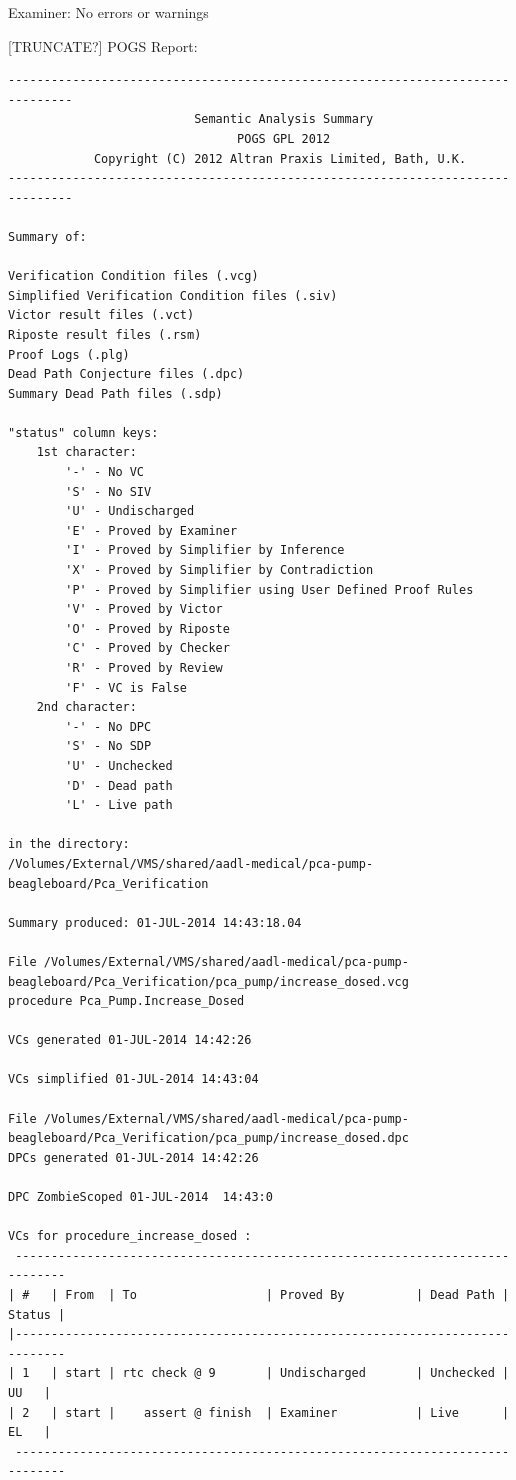 Examiner:
No errors or warnings

[TRUNCATE?]
POGS Report:
\singlespacing
\begin{lstlisting}[frame=single, gobble=0, caption={POGS report}]
-------------------------------------------------------------------------------
                          Semantic Analysis Summary                            
                                POGS GPL 2012                                  
            Copyright (C) 2012 Altran Praxis Limited, Bath, U.K.               
-------------------------------------------------------------------------------

Summary of:

Verification Condition files (.vcg)
Simplified Verification Condition files (.siv)
Victor result files (.vct)
Riposte result files (.rsm)
Proof Logs (.plg)
Dead Path Conjecture files (.dpc)
Summary Dead Path files (.sdp)

"status" column keys:
    1st character:
        '-' - No VC
        'S' - No SIV
        'U' - Undischarged
        'E' - Proved by Examiner
        'I' - Proved by Simplifier by Inference
        'X' - Proved by Simplifier by Contradiction
        'P' - Proved by Simplifier using User Defined Proof Rules
        'V' - Proved by Victor
        'O' - Proved by Riposte
        'C' - Proved by Checker
        'R' - Proved by Review
        'F' - VC is False
    2nd character:
        '-' - No DPC
        'S' - No SDP
        'U' - Unchecked
        'D' - Dead path
        'L' - Live path

in the directory:
/Volumes/External/VMS/shared/aadl-medical/pca-pump-beagleboard/Pca_Verification

Summary produced: 01-JUL-2014 14:43:18.04

File /Volumes/External/VMS/shared/aadl-medical/pca-pump-beagleboard/Pca_Verification/pca_pump/increase_dosed.vcg
procedure Pca_Pump.Increase_Dosed

VCs generated 01-JUL-2014 14:42:26

VCs simplified 01-JUL-2014 14:43:04

File /Volumes/External/VMS/shared/aadl-medical/pca-pump-beagleboard/Pca_Verification/pca_pump/increase_dosed.dpc
DPCs generated 01-JUL-2014 14:42:26

DPC ZombieScoped 01-JUL-2014  14:43:0

VCs for procedure_increase_dosed :
 -----------------------------------------------------------------------------
| #   | From  | To                  | Proved By          | Dead Path | Status |
|-----------------------------------------------------------------------------
| 1   | start | rtc check @ 9       | Undischarged       | Unchecked |   UU   |
| 2   | start |    assert @ finish  | Examiner           | Live      |   EL   |
 -----------------------------------------------------------------------------



\end{lstlisting}
